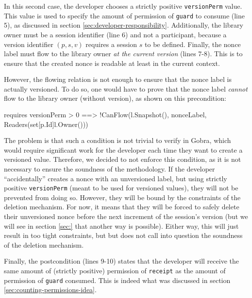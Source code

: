 In this second case, the developer chooses a strictly positive \texttt{versionPerm} value.
This value is used to specify the amount of permission of \texttt{guard} to consume (line 5), as discussed in section \ref{sec:developer-responsibility}.
Additionally, the library owner must be a session identifier (line 6) and not a participant, because a version identifier $(p,s,v)$ requires a session $s$ to be defined.
Finally, the nonce label must flow to the library owner \emph{at the current version} (lines 7-8).
This is to ensure that the created nonce is readable at least in the current context.

However, the flowing relation is not enough to ensure that the nonce label is actually versioned. To do so, one would have to prove that the nonce label \emph{cannot} flow to the library owner (without version), as shown on this precondition:

\begin{gobra}
requires versionPerm > 0 ==>
    !CanFlow(l.Snapshot(), nonceLabel, Readers(set[p.Id]{l.Owner()}))
\end{gobra}

The problem is that such a condition is not trivial to verify in Gobra, which would require significant work for the developer each time they want to create a versioned value.
Therefore, we decided to not enforce this condition, as it is not necessary to ensure the soundness of the methodology.
If the developer “accidentally” creates a nonce with an unversioned label, but using strictly positive \texttt{versionPerm} (meant to be used for versioned values), they will not be prevented from doing so.
However, they will be bound by the constraints of the deletion mechanism. For now, it means that they will be forced to safely delete their unversioned nonce before the next increment of the session's version (but we will see in section \ref{sec:} that another way is possible).
Either way, this will just result in too tight constraints, but but does not call into question the soundness of the deletion mechanism.

Finally, the postcondition (lines 9-10) states that the developer will receive the same amount of (strictly positive) permission of \texttt{receipt} as the amount of permission of \texttt{guard} consumed. This is indeed what was discussed in section \ref{sec:counting-permissions-idea}.


